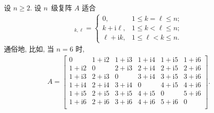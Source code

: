 \documentclass[../libro.tex]{subfiles}
\begin{document}
\begin{example}
    设 \(n \geq 2\).
    设 \(n\)~级复阵 \(A\) 适合
    \begin{align*}
        [A]_{k,\ell} =
        \begin{cases}
            0,                   & 1 \leq k = \ell \leq n; \\
            k + \mathrm{i} \ell, & 1 \leq k < \ell \leq n; \\
            \ell + \mathrm{i} k, & 1 \leq \ell < k \leq n.
        \end{cases}
    \end{align*}
    通俗地, 比如, 当 \(n = 6\) 时,
    \begin{align*}
        A =
        \begin{bmatrix}
            0                & 1 + \mathrm{i} 2 & 1 + \mathrm{i} 3 & 1 + \mathrm{i} 4 & 1 + \mathrm{i} 5 & 1 + \mathrm{i} 6 \\
            1 + \mathrm{i} 2 & 0                & 2 + \mathrm{i} 3 & 2 + \mathrm{i} 4 & 2 + \mathrm{i} 5 & 2 + \mathrm{i} 6 \\
            1 + \mathrm{i} 3 & 2 + \mathrm{i} 3 & 0                & 3 + \mathrm{i} 4 & 3 + \mathrm{i} 5 & 3 + \mathrm{i} 6 \\
            1 + \mathrm{i} 4 & 2 + \mathrm{i} 4 & 3 + \mathrm{i} 4 & 0                & 4 + \mathrm{i} 5 & 4 + \mathrm{i} 6 \\
            1 + \mathrm{i} 5 & 2 + \mathrm{i} 5 & 3 + \mathrm{i} 5 & 4 + \mathrm{i} 5 & 0                & 5 + \mathrm{i} 6 \\
            1 + \mathrm{i} 6 & 2 + \mathrm{i} 6 & 3 + \mathrm{i} 6 & 4 + \mathrm{i} 6 & 5 + \mathrm{i} 6 & 0                \\
        \end{bmatrix}.
    \end{align*}


\end{example}
\end{document}
